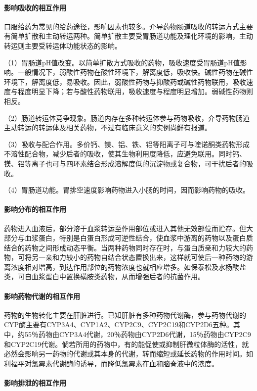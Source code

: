 \paragraph{影响吸收的相互作用}

口服给药为常见的给药途径，影响因素也较多。介导药物肠道吸收的转运方式主要有简单扩散和主动转运两种。简单扩散主要受胃肠道功能及理化环境的影响，主动转运则主要受转运体功能状态的影响。

（1）胃肠道pH值改变。以简单扩散方式吸收的药物，吸收速度受胃肠道pH值影响。一般情况下，弱酸性药物在酸性环境下，解离度低，吸收快。碱性药物在碱性环境下，解离度低，易吸收。因此，弱酸性药物与抑酸药或碱性药物联用，吸收速度与程度明显下降；若与酸性药物联用，吸收速度与程度明显增加。弱碱性药物则相反。

（2）肠道转运体竞争现象。肠道内存在多种转运体参与药物吸收，介导药物肠道主动转运的转运体及相关药物，不过有临床意义的实例尚鲜有报道。

（3）吸收与配合作用。多价钙、镁、铝、铁、铝等阳离子可与喹诺酮类药物形成不溶性配合物，减少后者的吸收，使其生物利用度降低，应避免联用。同时钙、镁、铝等离子也可与四环素结合形成溶解度低的沉淀物或复合物，可干扰后者的吸收。

（4）胃肠道功能。胃排空速度影响药物进入小肠的时间，因而影响药物的吸收。
\paragraph{影响分布的相互作用}

药物进入血液后，部分溶于血浆转运至作用部位或进入其他无效部位而贮存。但大部分与血浆蛋白，特别是白蛋白形成可逆性结合，使血浆中游离的药物以及蛋白质结合的药物之间形成动态平衡。当两种药物同时存在时，与蛋白质亲和力较大的药物，可将另一亲和力较小的药物自结合状态置换出来，这样就可使后一种药物的游离浓度相对增高，到达作用部位的药物浓度也就相应增多。如保泰松及水杨酸盐类，可自血浆蛋白中置换磺胺类药物，从而增强后者的抗菌作用。
\paragraph{影响药物代谢的相互作用}

药物的生物转化主要在肝脏进行。已知肝脏有多种药物代谢酶，参与药物代谢的CYP酶主要有CYP3A4、CYP1A2、CYP2C9、CYP2C19和CYP2D6五种。其中，约55％药物由CYP3A4代谢，20％药物由CYP2D6代谢，15％药物由CYP2C9和CYP2C19代谢。倘若所用的药物中，有的能促使或抑制肝微粒体酶的活性，就必然会影响另一药物的代谢或其本身的代谢，转而缩短或延长药物的作用时间。如利福平对氯霉素代谢酶的诱导，而降低氯霉素在血和脑脊液中的浓度。
\paragraph{影响排泄的相互作用}

